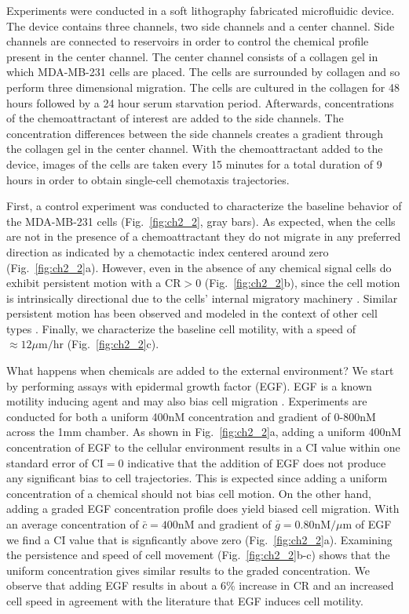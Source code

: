 Experiments were conducted in a soft lithography fabricated microfluidic device. The device contains three channels, two side channels and a center channel. Side channels are connected to reservoirs in order to control the chemical profile present in the center channel. The center channel consists of a collagen gel in which MDA-MB-231 cells are placed. The cells are surrounded by collagen and so perform three dimensional migration. The cells are cultured in the collagen for 48 hours followed by a 24 hour serum starvation period. Afterwards, concentrations of the chemoattractant of interest are added to the side channels. The concentration differences between the side channels creates a gradient through the collagen gel in the center channel. With the chemoattractant added to the device, images of the cells are taken every 15 minutes for a total duration of 9 hours in order to obtain single-cell chemotaxis trajectories.

First, a control experiment was conducted to characterize the baseline behavior of the MDA-MB-231 cells (Fig.\ \ref{fig:ch2_2}, gray bars). As expected, when the cells are not in the presence of a chemoattractant they do not migrate in any preferred direction as indicated by a chemotactic index centered around zero (Fig.\ \ref{fig:ch2_2}a). However, even in the absence of any chemical signal cells do exhibit persistent motion with a $\text{CR} > 0$ (Fig.\ \ref{fig:ch2_2}b), since the cell motion is intrinsically directional due to the cells' internal migratory machinery \cite{petrie2009random}.
Similar persistent motion has been observed and modeled in the context of other cell types \cite{kim2013cooperative,codling2008random,othmer1988models}. Finally, we characterize the baseline cell motility, with a speed of $\approx 12 \mu\text{m/hr}$ (Fig.\ \ref{fig:ch2_2}c).

What happens when chemicals are added to the external environment? We start by performing assays with epidermal growth factor (EGF). EGF is a known motility inducing agent \cite{kim2013cooperative,mosadegh2008epidermal} and may also bias cell migration \cite{wang2004differential}. Experiments are conducted for both a uniform 400nM concentration and gradient of 0-800nM across the 1mm chamber.
As shown in Fig.\ \ref{fig:ch2_2}a, adding a uniform $400$nM concentration of EGF to the cellular environment results in a CI value within one standard error of $\text{CI} = 0$ indicative that the addition of EGF does not produce any significant bias to cell trajectories. This is expected since adding a uniform concentration of a chemical should not bias cell motion.
On the other hand, adding a graded EGF concentration profile does yield biased cell migration. With an average concentration of
$\bar{c}=400 \text{nM}$ and gradient of
$\bar{g}=0.80 \text{nM} / \mu\text{m}$
of EGF we find a CI value that is signficantly above zero (Fig.\ \ref{fig:ch2_2}a).
Examining the persistence and speed of cell movement (Fig.\ \ref{fig:ch2_2}b-c) shows that the uniform concentration gives similar results to the graded concentration. We observe that adding EGF results in about a 6\% increase in CR and an increased cell speed in agreement with the literature that EGF induces cell motility.

